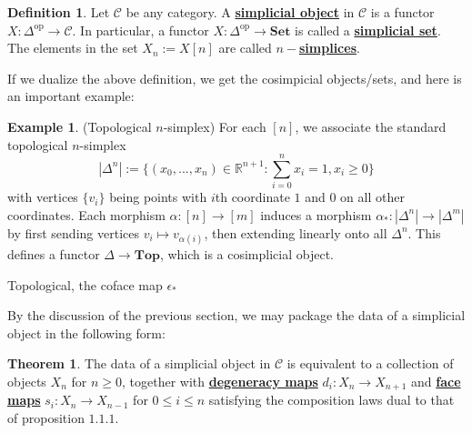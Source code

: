 \documentclass{article}
\theoremstyle{definition}
\newtheorem{theorem}{Theorem}[section]
\theoremstyle{definition}
\newtheorem{definition}{Definition}[theorem]
\theoremstyle{definition}
\theoremstyle{definition}
\theoremstyle{definition}
\theoremstyle{definition}
\theoremstyle{definition}
\newtheorem{example}{Example}[theorem]
\begin{document}
\begin{tcolorbox}[colback=purple!5!white,colframe=purple!75!black]
\begin{definition}
Let $\mathcal{C}$ be any category. A \underline{\textbf{simplicial object}} in $\mathcal{C}$ is a  functor $X: \Delta^{\textrm{op}}\to \mathcal{C}$. In particular, a functor $X: \Delta^{\textrm{op}}\to \textbf{Set}$ is called a \underline{\textbf{simplicial set}}. The elements in the set $X_n:=X[n]$ are called $n-$\underline{\textbf{simplices}}.
\end{definition}
\end{tcolorbox}
If we dualize the above definition, we get the cosimpicial objects/sets, and here is an important example:

\begin{tcolorbox}[colback=yellow!5!white,colframe=yellow!30!white]
    \begin{example}
    (Topological $n$-simplex) For each $[n]$, we associate the standard topological $n$-simplex
    \[|\Delta^n|
    :=\{ (x_0,...,x_{n})\in \mathbb{R}^{n+1}: \sum_{i=0}^{n}x_i=1, x_i\geq 0 \}\]
    with vertices $\{v_i\}$ being points with $i$th coordinate $1$ and $0$ on all other coordinates. Each morphism $\alpha:[n]\to [m]$ induces a morphism $\alpha_*:|\Delta^n|\to |\Delta^m|$ by first sending vertices $v_i\mapsto v_{\alpha(i)}$, then extending linearly onto all $\Delta^n$. This defines a functor $\Delta\to \textbf{Top}$, which is a cosimplicial object.

    Topological, the coface map $\epsilon_*$
    \end{example}
    \end{tcolorbox}
    




By the discussion of the previous section, we may package the data of a simplicial object in the following form:
\begin{tcolorbox}[colback=red!5!white,colframe=red!30!white]
\begin{theorem}
The data of a simplicial object in $\mathcal{C}$ is equivalent to a collection of objects $X_n$ for $n\geq 0$, together with \underline{\textbf{degeneracy maps}} $d_i: X_n\to X_{n+1}$ and \underline{\textbf{face maps}} $s_i: X_{n}\to X_{n-1}$ for $0\leq i\leq n$ satisfying the composition laws dual to that of proposition $1.1.1$.
\end{theorem}
\end{tcolorbox}
\end{document}
